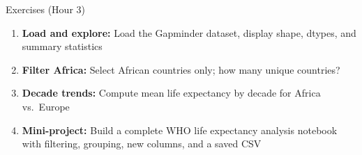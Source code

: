 \documentclass[aspectratio=169,11pt]{beamer}
\begin{document}
\begin{frame}{Exercises (Hour 3)}
\begin{enumerate}
  \item \textbf{Load and explore:} Load the Gapminder dataset, display shape, dtypes, and summary statistics
  \item \textbf{Filter Africa:} Select African countries only; how many unique countries?
  \item \textbf{Decade trends:} Compute mean life expectancy by decade for Africa vs.\ Europe
  \item \textbf{Mini-project:} Build a complete WHO life expectancy analysis notebook with filtering, grouping, new columns, and a saved CSV
\end{enumerate}
\end{frame}
\end{document}
